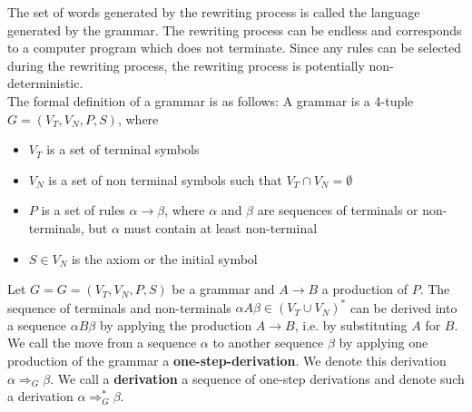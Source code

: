 The set of words generated by the rewriting process is called the language generated by the grammar.
The rewriting process can be endless and corresponds to a computer program which does not terminate.
Since any rules can be selected during the rewriting process, the rewriting process is potentially 
non-deterministic.\\

The formal definition of a grammar is as follows: A grammar is a 4-tuple $G = (V_T, V_N, P, S)$, where 
\begin{itemize}
  \item $V_T$ is a set of terminal symbols
  \item $V_N$ is a set of non terminal symbols such that $V_T \cap V_N = \emptyset$
  \item $P$ is a set of rules $\alpha \rightarrow \beta$, where $\alpha$ and $\beta$ are sequences
        of terminals or non-terminals, but $\alpha$ must contain at least non-terminal
  \item $S \in V_N$ is the axiom or the initial symbol
\end{itemize}
Let $G = G = (V_T, V_N, P, S)$ be a grammar and $A \rightarrow B$
a production of $P$. The sequence of terminals and non-terminals $\alpha A\beta \in (V_T \cup V_N)^{*}$
can be derived into a sequence $\alpha B\beta$ by applying the production $A \rightarrow B$,
i.e. by substituting $A$ for $B$. We call the move from a sequence $\alpha$ to another sequence $\beta$
by applying one production of the grammar a \textbf{one-step-derivation}.
We denote this derivation $\alpha \Rightarrow_G \beta$. We call a \textbf{derivation} a sequence of one-step
derivations and denote such a derivation $\alpha \Rightarrow_G^{*}\beta$.\\


